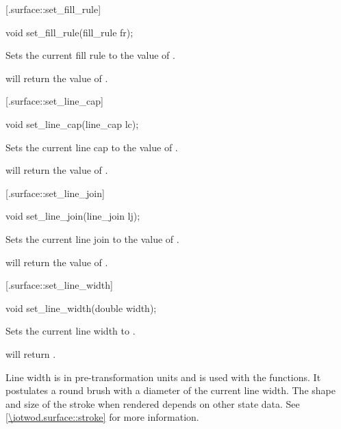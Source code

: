  [\iotwod.surface::set_fill_rule] {}

%
%
\begin{itemdecl}
void set_fill_rule(fill_rule fr);
\end{itemdecl}
\begin{itemdescr}
	\pnum
	\effects
	Sets the current fill rule to the value of .
	
	\pnum
	\postconditions
	 will return the value of .
\end{itemdescr}

 [\iotwod.surface::set_line_cap] {}

%
%
\begin{itemdecl}
void set_line_cap(line_cap lc);
\end{itemdecl}
\begin{itemdescr}
	\pnum
	\effects
	Sets the current line cap to the value of .
		
	\pnum
	\postconditions
	 will return the value of .
\end{itemdescr}

 [\iotwod.surface::set_line_join] {}

%
%
\begin{itemdecl}
void set_line_join(line_join lj);
\end{itemdecl}
\begin{itemdescr}
	\pnum
	\effects
	Sets the current line join to the value of .
	
	\pnum
	\postconditions
	 will return the value of .
\end{itemdescr}

 [\iotwod.surface::set_line_width] {}

%
%
\begin{itemdecl}
void set_line_width(double width);
\end{itemdecl}
\begin{itemdescr}
	\pnum
	\effects
	Sets the current line width to .
	
	\pnum
	\postconditions
	 will return .
	
	\pnum
	\remarks
	Line width is in pre-transformation units and is used with the  functions. It postulates a round brush with a diameter of the current line width. The shape and size of the stroke when rendered depends on other state data. See \ref{\iotwod.surface::stroke} for more information.
\end{itemdescr}

